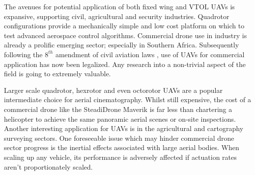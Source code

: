 \par
The avenues for potential application of both fixed wing and VTOL UAVs is expansive, supporting civil\cite{civilquadcopter}, agricultural\cite{agriculturequadcopter} and security\cite{videosurveillancequadcopter} industries. Quadrotor configurations provide a mechanically simple and low cost platform on which to test advanced aerospace control algorithms. Commercial drone use in industry is already a prolific emerging sector; especially in Southern Africa. Subsequently following the $8^{th}$ amendment of civil aviation laws \cite{dronelaw}, use of UAVs for commercial application has now been legalized. Any research into a non-trivial aspect of the field is going to extremely valuable. 
\par
Larger scale quadrotor, hexrotor and even octorotor UAVs are a popular intermediate choice for aerial cinematography.  Whilst still expensive, the cost of a commercial drone like the SteadiDrone Maverik \cite{steadidrone} is far less than chartering a helicopter to achieve the same panoramic aerial scenes or on-site inspections. Another interesting application for UAVs is in the agricultural and cartography surveying sectors. One foreseeable issue which may hinder commercial drone sector progress is the inertial effects associated with large aerial bodies. When scaling up any vehicle, its performance is adversely affected if actuation rates aren't proportionately scaled.
